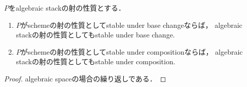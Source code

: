 \documentclass[a4paper, dvipdfmx]{jsarticle}
\newcommand{\rep}{{\color{blue}\#}}
\begin{document}
\begin{Lemma}[\rep]
        $P$をalgebraic stackの射の性質とする．
\begin{enumerate}
    \item
        $P$がschemeの射の性質としてstable under base changeならば，
        algebraic stackの射の性質としてもstable under base change.
    \item
        $P$がschemeの射の性質としてstable under compositionならば，
        algebraic stackの射の性質としてもstable under composition.
\end{enumerate}
\end{Lemma}
\begin{proof}
    algebraic spaceの場合の繰り返しである．
\end{proof}



\end{document}
